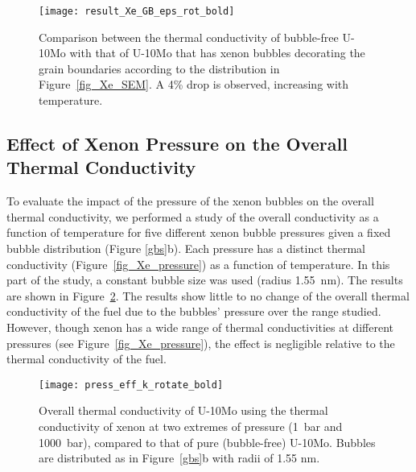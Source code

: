 \begin{figure}
	\centering
	\texttt{[image: result\_Xe\_GB\_eps\_rot\_bold]}
    \caption{Comparison between the thermal conductivity of bubble-free U-10Mo
      with that of U-10Mo that has xenon bubbles decorating the grain
      boundaries according to the distribution in Figure~\ref{fig_Xe_SEM}. A
      4\% drop is observed, increasing with temperature.}
	\label{fig_eff_K_GB}
\end{figure}

\subsection{Effect of Xenon Pressure on the Overall Thermal Conductivity}
\label{subsec:xenonpressure}
To evaluate the impact of the pressure of the xenon bubbles on the overall thermal conductivity, we performed a study of the overall conductivity as a function of temperature for five different xenon bubble pressures given a fixed bubble distribution (Figure \ref{gbs}b). Each pressure has a distinct thermal conductivity (Figure~\ref{fig_Xe_pressure}) as a function of temperature. In this part of the study, a constant bubble size was used (radius 1.55~nm). The results are shown in Figure~\ref{fig_press_K}. The results show little to no change of the overall thermal conductivity of the fuel due to the bubbles' pressure over the range studied. However, though xenon has a wide range of thermal conductivities at different pressures (see Figure~\ref{fig_Xe_pressure}), the effect is negligible relative to the thermal conductivity of the fuel. 


\begin{figure}
	\centering
	\texttt{[image: press\_eff\_k\_rotate\_bold]}
	\caption{Overall thermal conductivity of U-10Mo using the thermal 
        conductivity of xenon at two extremes of pressure
        (1~bar and 1000~bar), compared to that of pure (bubble-free) U-10Mo. Bubbles are distributed as in Figure~\ref{gbs}b with radii of 1.55 nm.}
	\label{fig_press_K}
\end{figure}

